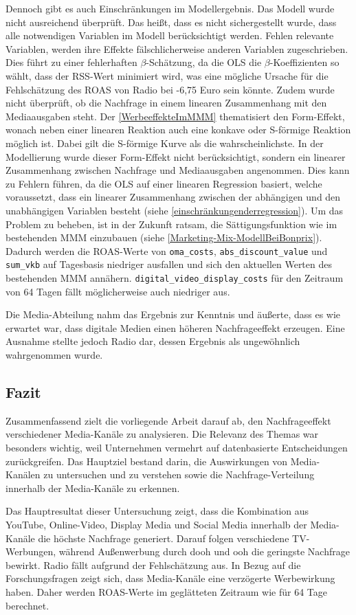 Dennoch gibt es auch Einschränkungen im Modellergebnis. Das Modell wurde nicht ausreichend überprüft. Das heißt, dass es nicht sichergestellt wurde, dass alle notwendigen Variablen im Modell berücksichtigt werden. Fehlen relevante Variablen, werden ihre Effekte fälschlicherweise anderen Variablen zugeschrieben. Dies führt zu einer fehlerhaften $\beta$-Schätzung, da die \ac{OLS} die $\beta$-Koeffizienten so wählt, dass der \ac{RSS}-Wert minimiert wird, was eine mögliche Ursache für die Fehlschätzung des \ac{ROAS} von Radio bei -6,75 Euro sein könnte. Zudem wurde nicht überprüft, ob die Nachfrage in einem linearen Zusammenhang mit den Mediaausgaben steht. Der \autoref{WerbeeffekteImMMM} thematisiert den Form-Effekt, wonach neben einer linearen Reaktion auch eine konkave oder S-förmige Reaktion möglich ist. Dabei gilt die S-förmige Kurve als die wahrscheinlichste. In der Modellierung wurde dieser Form-Effekt nicht berücksichtigt, sondern ein linearer Zusammenhang zwischen Nachfrage und Mediaausgaben angenommen. Dies kann zu Fehlern führen, da die \ac{OLS} auf einer linearen Regression basiert, welche voraussetzt, dass ein linearer Zusammenhang zwischen der abhängigen und den unabhängigen Variablen besteht (siehe \autoref{einschränkungenderregression}). Um das Problem zu beheben, ist in der Zukunft ratsam, die Sättigungsfunktion wie im bestehenden \ac{MMM} einzubauen (siehe \autoref{Marketing-Mix-ModellBeiBonprix}). Dadurch werden die \ac{ROAS}-Werte von \verb|oma_costs|, \verb|abs_discount_value| und \verb|sum_vkb| auf Tagesbasis niedriger ausfallen und sich den aktuellen Werten des bestehenden \ac{MMM} annähern. \verb|digital_video_display_costs| für den Zeitraum von 64 Tagen fällt möglicherweise auch niedriger aus. \par
Die Media-Abteilung nahm das Ergebnis zur Kenntnis und äußerte, dass es wie erwartet war, dass digitale Medien einen höheren Nachfrageeffekt erzeugen. Eine Ausnahme stellte jedoch Radio dar, dessen Ergebnis als ungewöhnlich wahrgenommen wurde.
\newpage
\subsection{Fazit}
\label{Fazit}
Zusammenfassend zielt die vorliegende Arbeit darauf ab, den Nachfrageeffekt verschiedener Media-Kanäle zu analysieren. Die Relevanz des Themas war besonders wichtig, weil Unternehmen vermehrt auf datenbasierte Entscheidungen zurückgreifen. Das Hauptziel bestand darin, die Auswirkungen von Media-Kanälen zu untersuchen und zu verstehen sowie die Nachfrage-Verteilung innerhalb der Media-Kanäle zu erkennen. \par
Das Hauptresultat dieser Untersuchung zeigt, dass die Kombination aus YouTube, Online-Video, Display Media und Social Media innerhalb der Media-Kanäle die höchste Nachfrage generiert. Darauf folgen verschiedene TV-Werbungen, während Außenwerbung durch \ac{dooh} und \ac{ooh} die geringste Nachfrage bewirkt. Radio fällt aufgrund der Fehlschätzung aus. In Bezug auf die Forschungsfragen zeigt sich, dass Media-Kanäle eine verzögerte Werbewirkung haben. Daher werden \ac{ROAS}-Werte im geglätteten Zeitraum wie für 64 Tage berechnet.  